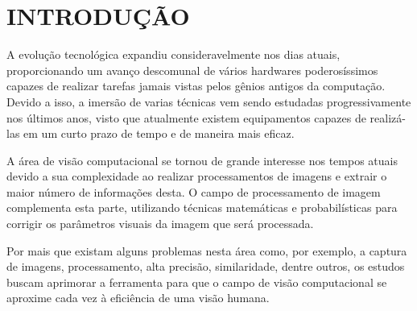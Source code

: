 \chapter{\textbf{INTRODUÇÃO}}
\label{cap-introducao}
A evolução tecnológica expandiu consideravelmente nos dias atuais, proporcionando um avanço descomunal de vários hardwares poderosíssimos capazes de realizar tarefas jamais vistas pelos gênios antigos da computação. Devido a isso, a imersão de varias técnicas vem sendo estudadas progressivamente nos últimos anos, visto que atualmente existem equipamentos capazes de realizá-las em um curto prazo de tempo e de maneira mais eficaz.

A área de visão computacional se tornou de grande interesse nos tempos atuais devido a sua complexidade ao realizar processamentos de imagens e extrair o maior número de informações desta. O campo de processamento de imagem complementa esta parte, utilizando técnicas matemáticas e probabilísticas para corrigir os parâmetros visuais da imagem que será processada.

Por mais que existam alguns problemas nesta área como, por exemplo, a captura de imagens, processamento, alta precisão, similaridade, dentre outros, os estudos buscam aprimorar a ferramenta para que o campo de visão computacional se aproxime cada vez à eficiência de uma visão humana.



